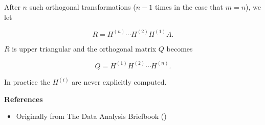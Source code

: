 \documentclass{article}
\begin{document}
After $n$ such orthogonal transformations ($n-1$ times in the case that $m=n$),    we let

$$ R = H^{(n)}\cdots H^{(2)}H^{(1)}A.$$

$R$ is upper triangular and the orthogonal matrix $Q$ becomes

$$ Q = H^{(1)}H^{(2)} \cdots H^{(n)}.$$

In practice the $H^{(i)}$ are never explicitly computed.

{\bf References}

\begin{itemize}
\item Originally from The Data Analysis Briefbook
()
\end{itemize}
\end{document}
